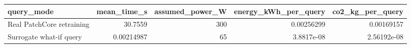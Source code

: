 \begin{tabular}{lrrrr}
\toprule
               query\_mode &  mean\_time\_s &  assumed\_power\_W &  energy\_kWh\_per\_query &  co2\_kg\_per\_query \\
\midrule
Real PatchCore retraining &      30.7559 &              300 &            0.00256299 &        0.00169157 \\
  Surrogate what-if query &   0.00214987 &               65 &            3.8817e-08 &       2.56192e-08 \\
\bottomrule
\end{tabular}
